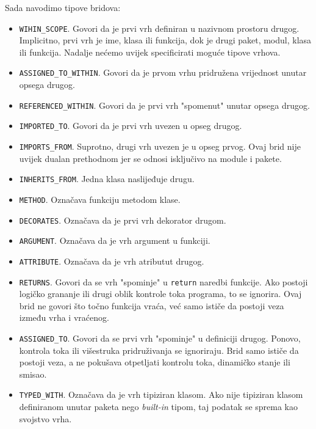 Sada navodimo tipove bridova:
\begin{itemize}
\item \texttt{WIHIN_SCOPE}. Govori da je prvi vrh definiran u nazivnom prostoru drugog. Implicitno, prvi vrh je ime, klasa ili funkcija,
dok je drugi paket, modul, klasa ili funkcija. Nadalje nećemo uvijek specificirati moguće tipove vrhova.

\item \texttt{ASSIGNED_TO_WITHIN}. Govori da je prvom vrhu pridružena vrijednost unutar opsega drugog.
\item \texttt{REFERENCED_WITHIN}. Govori da je prvi vrh "spomenut" unutar opsega drugog.

\item \texttt{IMPORTED_TO}. Govori da je prvi vrh uvezen u opseg drugog.
\item \texttt{IMPORTS_FROM}. Suprotno, drugi vrh uvezen je u opseg prvog. Ovaj brid nije uvijek
dualan prethodnom jer se odnosi isključivo na module i pakete.

\item \texttt{INHERITS_FROM}. Jedna klasa naslijeđuje drugu.

\item \texttt{METHOD}. Označava funkciju metodom klase.
\item \texttt{DECORATES}. Označava da je prvi vrh dekorator drugom.
\item \texttt{ARGUMENT}. Označava da je vrh argument u funkciji.

\item \texttt{ATTRIBUTE}. Označava da je vrh atributut drugog.

\item \texttt{RETURNS}. Govori da se vrh "spominje" u \texttt{return} naredbi funkcije. Ako postoji
logičko grananje ili drugi oblik kontrole toka programa, to se ignorira. Ovaj brid ne govori
što točno funkcija vraća, već samo ističe da postoji veza između vrha i vraćenog.
\item \texttt{ASSIGNED_TO}. Govori da se prvi vrh "spominje" u definiciji drugog. Ponovo,
kontrola toka ili višestruka pridruživanja se ignoriraju. Brid samo ističe da postoji veza,
a ne pokušava otpetljati kontrolu toka, dinamičko stanje ili smisao.

\item \texttt{TYPED_WITH}. Označava da je vrh tipiziran klasom. Ako nije tipiziran klasom
definiranom unutar paketa nego \emph{built-in} tipom, taj podatak se sprema kao svojstvo vrha.

\end{itemize}

